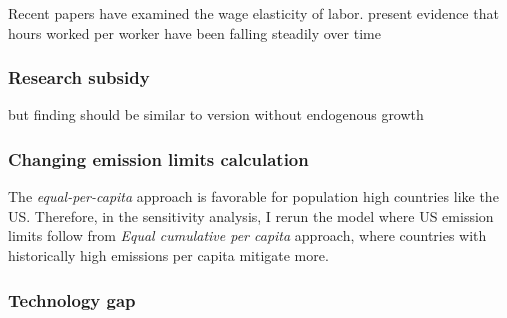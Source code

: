 Recent papers have examined the wage elasticity of labor. \cite{Boppart2019LaborPerspectiveb} present evidence that hours worked per worker have been falling steadily over time 

\subsubsection{Research subsidy}
but finding should be similar to version without endogenous growth
\subsubsection{Changing emission limits calculation}
The \textit{equal-per-capita} approach is favorable for population high countries like the US. Therefore, in the sensitivity analysis, I rerun the model where US emission limits follow from \textit{Equal cumulative per capita} approach, where countries with historically  high emissions per capita mitigate more.

\subsubsection{Technology gap}